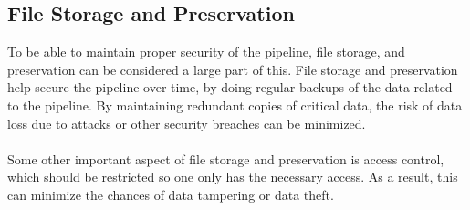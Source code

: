 \subsection{File Storage and Preservation}
To be able to maintain proper security of the pipeline, file storage, and preservation can be considered a large part of this. File storage and preservation help secure the pipeline over time, by doing regular backups of the data related to the pipeline. By maintaining redundant copies of critical data, the risk of data loss due to attacks or other security breaches can be minimized. 
\\~\\
Some other important aspect of file storage and preservation is access control, which should be restricted so one only has the necessary access. As a result, this can minimize the chances of data tampering or data theft.

